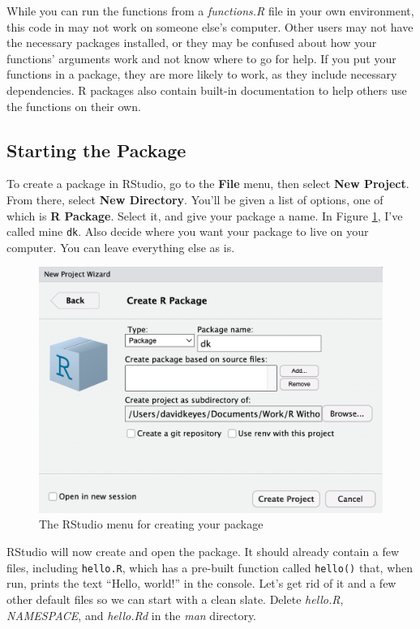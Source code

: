 \documentclass[
]{book}
\begin{document}
While you can run the functions from a \emph{functions.R} file in your own environment, this code in may not work on someone else's computer. Other users may not have the necessary packages installed, or they may be confused about how your functions' arguments work and not know where to go for help. If you put your functions in a package, they are more likely to work, as they include necessary dependencies. R packages also contain built-in documentation to help others use the functions on their own.

\hypertarget{starting-the-package}{%
\subsection*{Starting the Package}\label{starting-the-package}}

To create a package in RStudio, go to the \textbf{File} menu, then select \textbf{New Project}. From there, select \textbf{New Directory}. You'll be given a list of options, one of which is \textbf{R Package}. Select it, and give your package a name. In Figure \ref{fig:rstudio-create-package}, I've called mine \texttt{dk}. Also decide where you want your package to live on your computer. You can leave everything else as is.

\begin{figure}
\includegraphics[width=1\linewidth]{assets/create-r-package} \caption{The RStudio menu for creating your package}\label{fig:rstudio-create-package}
\end{figure}

RStudio will now create and open the package. It should already contain a few files, including \texttt{hello.R}, which has a pre-built function called \texttt{hello()} that, when run, prints the text ``Hello, world!'' in the console. Let's get rid of it and a few other default files so we can start with a clean slate. Delete \emph{hello.R}, \emph{NAMESPACE}, and \emph{hello.Rd} in the \emph{man} directory.
\end{document}
